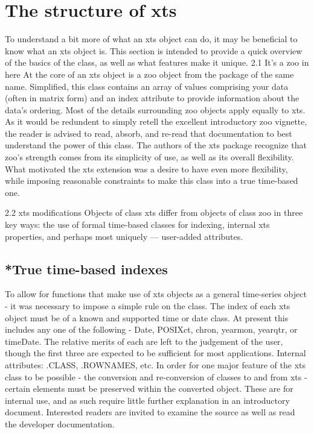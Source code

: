 
\section*{The structure of xts}
To understand a bit more of what an xts object can do, it may be beneficial to
know what an xts object is. This section is intended to provide a quick overview
of the basics of the class, as well as what features make it unique.
2.1 It’s a zoo in here
At the core of an xts object is a zoo object from the package of the same
name. Simplified, this class contains an array of values comprising your data
(often in matrix form) and an index attribute to provide information about the
data’s ordering. Most of the details surrounding zoo objects apply equally to
xts. As it would be redundent to simply retell the excellent introductory zoo
vignette, the reader is advised to read, absorb, and re-read that documentation
to best understand the power of this class. The authors of the xts package
recognize that zoo’s strength comes from its simplicity of use, as well as its
overall flexibility. What motivated the xts extension was a desire to have even
more flexibility, while imposing reasonable constraints to make this class into a
true time-based one.

2.2 xts modifications
Objects of class xts differ from objects of class zoo in three key ways: the use
of formal time-based classes for indexing, internal xts properties, and perhaps
most uniquely — user-added attributes.
\subsection{*True time-based indexes}
To allow for functions that make use of xts objects as a general time-series
object - it was necessary to impose a simple rule on the class. The index of each
xts object must be of a known and supported time or date class. At present
this includes any one of the following - Date, POSIXct, chron, yearmon, yearqtr,
or timeDate. The relative merits of each are left to the judgement of the user,
though the first three are expected to be sufficient for most applications.
Internal attributes: .CLASS, .ROWNAMES, etc.
In order for one major feature of the xts class to be possible - the conversion and
re-conversion of classes to and from xts - certain elements must be preserved
within the converted object. These are for internal use, and as such require
little further explanation in an introductory document. Interested readers are
invited to examine the source as well as read the developer documentation.
